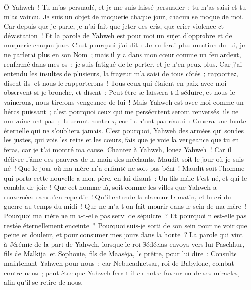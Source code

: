 \begin{multicols}{2}
Ô Yahweh~! Tu m'as persuadé, et je me suis laissé persuader~; tu m'as saisi et tu m'as vaincu. Je suis un objet de moquerie chaque jour, chacun se moque de moi.
Car depuis que je parle, je n'ai fait que jeter des cris, que crier violence et dévastation~! Et la parole de Yahweh est pour moi un sujet d'opprobre et de moquerie chaque jour.
C'est pourquoi j'ai dit~: Je ne ferai plus mention de lui, je ne parlerai plus en son Nom~; mais il y a dans mon cœur comme un feu ardent, renfermé dans mes os~; je suis fatigué de le porter, et je n'en peux plus.
Car j'ai entendu les insultes de plusieurs, la frayeur m'a saisi de tous côtés~; rapportez, disent-ils, et nous le rapporterons~! Tous ceux qui étaient en paix avec moi observent si je bronche, et disent~: Peut-être se laissera-t-il séduire, et nous le vaincrons, nous tirerons vengeance de lui~!
Mais Yahweh est avec moi comme un héros puissant~; c'est pourquoi ceux qui me persécutent seront renversés, ils ne me vaincront pas~; ils seront honteux, car ils n'ont pas réussi~: Ce sera une honte éternelle qui ne s'oubliera jamais.
C'est pourquoi, Yahweh des armées qui sondes les justes, qui vois les reins et les cœurs, fais que je voie la vengeance que tu en feras, car je t'ai montré ma cause.
Chantez à Yahweh, louez Yahweh~! Car il délivre l'âme des pauvres de la main des méchants.
Maudit soit le jour où je suis né~! Que le jour où ma mère m'a enfanté ne soit pas béni~!
Maudit soit l'homme qui porta cette nouvelle à mon père, en lui disant~: Un fils mâle t'est né, et qui le combla de joie~!
Que cet homme-là, soit comme les villes que Yahweh a renversées sans s'en repentir~! Qu'il entende la clameur le matin, et le cri de guerre au temps du midi~!
Que ne m'a-t-on fait mourir dans le sein de ma mère~! Pourquoi ma mère ne m'a-t-elle pas servi de sépulcre~? Et pourquoi n'est-elle pas restée éternellement enceinte~?
Pourquoi suis-je sorti de son sein pour ne voir que peine et douleur, et pour consumer mes jours dans la honte~?
\VerseOne{}La parole qui vint à Jérémie de la part de Yahweh, lorsque le roi Sédécias envoya vers lui Paschhur, fils de Malkija, et Sophonie, fils de Maaséja, le prêtre, pour lui dire~:
Consulte maintenant Yahweh pour nous~; car Nebucadnetsar, roi de Babylone, combat contre nous~; peut-être que Yahweh fera-t-il en notre faveur un de ses miracles, afin qu'il se retire de nous.

\end{multicols}
